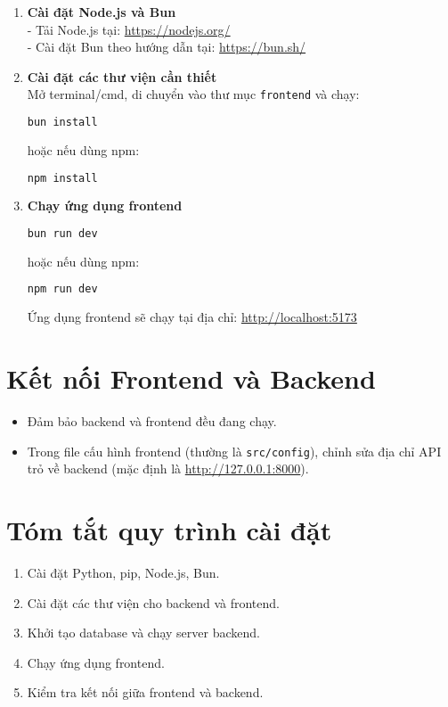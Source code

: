 \documentclass{book}
\let\oldsection\section
\renewcommand{\section}{\clearpage\oldsection}
\begin{document}
\begin{enumerate}
    \item \textbf{Cài đặt Node.js và Bun} \\
    - Tải Node.js tại: \url{https://nodejs.org/} \\
    - Cài đặt Bun theo hướng dẫn tại: \url{https://bun.sh/}
    \item \textbf{Cài đặt các thư viện cần thiết} \\
    Mở terminal/cmd, di chuyển vào thư mục \texttt{frontend} và chạy:
    \begin{lstlisting}[language=bash]
bun install
    \end{lstlisting}
    hoặc nếu dùng npm:
    \begin{lstlisting}[language=bash]
npm install
    \end{lstlisting}
    \item \textbf{Chạy ứng dụng frontend} \\
    \begin{lstlisting}[language=bash]
bun run dev
    \end{lstlisting}
    hoặc nếu dùng npm:
    \begin{lstlisting}[language=bash]
npm run dev
    \end{lstlisting}
    Ứng dụng frontend sẽ chạy tại địa chỉ: \url{http://localhost:5173}
\end{enumerate}

\section{Kết nối Frontend và Backend}

\begin{itemize}
    \item Đảm bảo backend và frontend đều đang chạy.
    \item Trong file cấu hình frontend (thường là \texttt{src/config}), chỉnh sửa địa chỉ API trỏ về backend (mặc định là \url{http://127.0.0.1:8000}).
\end{itemize}

\section{Tóm tắt quy trình cài đặt}

\begin{enumerate}
    \item Cài đặt Python, pip, Node.js, Bun.
    \item Cài đặt các thư viện cho backend và frontend.
    \item Khởi tạo database và chạy server backend.
    \item Chạy ứng dụng frontend.
    \item Kiểm tra kết nối giữa frontend và backend.
\end{enumerate}
\end{document}
